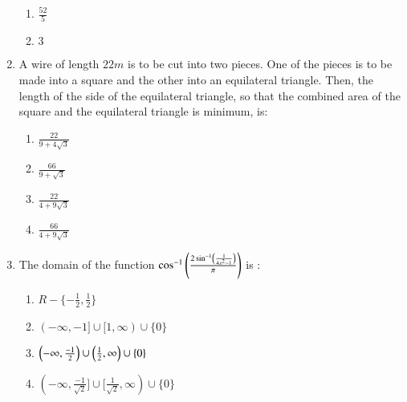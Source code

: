 \documentclass[journal,12pt,twocolumn]{IEEEtran}
\theoremstyle{remark}
\begin{document}
\begin{enumerate}
\begin{multicols}{2}
\begin{enumerate}
    \item $\frac{52}{5}$
    \item $3$
\end{enumerate}
\end{multicols}
\bigskip
\item A wire of length $22m$ is to be cut into two pieces. One of the pieces is to be made into a square and the other into an equilateral triangle. Then, the length of the side of the equilateral triangle, so that the combined area of the square and the equilateral triangle is minimum, is:
\begin{multicols}{2}
\begin{enumerate}
    \item $\frac{22}{9+4\sqrt{3}}$
    \item $\frac{66}{9+\sqrt{3}}$
    \item $\frac{22}{4+9\sqrt{3}}$
    \item $\frac{66}{4+9\sqrt{3}}$
\end{enumerate}
\end{multicols}
\bigskip
\item The domain of the function $\cos^{-1}\left(\frac{2\sin^{-1}\left(\frac{1}{4x^2-1}\right)}{\pi}\right)$ is :
\begin{enumerate}
    \item $R-\{-\frac{1}{2},\frac{1}{2}\}$
    \item $(-\infty,-1]\cup [1,\infty)\cup \{0\}$
    \item $\left(-\infty,\frac{-1}{2}\right)\cup\left(\frac{1}{2},\infty\right)\cup \{0\}$
    \item $(-\infty,\frac{-1}{\sqrt{2}}]\cup [\frac{1}{\sqrt{2}},\infty)\cup \{0\}$
\end{enumerate}
\bigskip
\end{enumerate}
\end{document}
